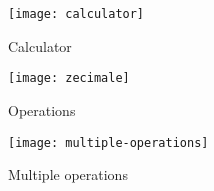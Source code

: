 \begin{center}
	\begin{figure}[h]
		\centering
		\texttt{[image: calculator]}\\
		\caption{Calculator}
		\label{run}
	\end{figure}
	
	\begin{figure}[h]
		\centering
		\texttt{[image: zecimale]}\\
		\caption{Operations}
		\label{jump}
	\end{figure}
	
	\begin{figure}[h]
		\centering
		\texttt{[image: multiple-operations]}\\
		\caption{Multiple operations}
		\label{slide}
	\end{figure}
\end{center}

\clearpage